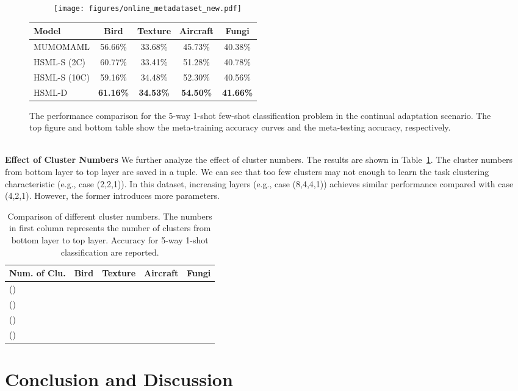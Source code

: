 \documentclass{article}
\begin{document}
\begin{figure}[h]
	\centering
	\begin{subfigure}[b]{0.85\linewidth}
	\centering
		\texttt{[image: figures/online\_metadataset\_new.pdf]}
	\end{subfigure}
	\begin{subtable}{0.95\linewidth}
	\small
        \centering
        \begin{tabular}{l|c|c|c|c}
        \hline
        Model & Bird & Texture & Aircraft & Fungi \\\hline
        MUMOMAML & 56.66\% & 33.68\% & 45.73\% & 40.38\% \\
        HSML-S (2C) & 60.77\% & 33.41\% & 51.28\% & 40.78\%\\
        HSML-S (10C) & 59.16\% & 34.48\% & 52.30\% & 40.56\%\\
        HSML-D & \textbf{61.16\%} & \textbf{34.53\%} & \textbf{54.50\%} & \textbf{41.66\%}\\\hline
        \end{tabular}
    \end{subtable}  
	\caption{The performance comparison for the 5-way 1-shot few-shot classification problem in the continual adaptation scenario. The top figure and bottom table show the meta-training accuracy curves and the meta-testing accuracy, respectively.} 
	\label{fig:metadataset_online}
\end{figure}
\\
\textbf{Effect of Cluster Numbers}
We further analyze the effect of cluster numbers. The results are shown in Table~\ref{tab:cluster_sensitivity}. The cluster numbers from bottom layer to top layer are saved in a tuple. We can see that too few clusters may not enough to learn the task clustering characteristic (e.g., case (2,2,1)). In this dataset, increasing layers (e.g., case (8,4,4,1)) 
achieves similar performance compared with case (4,2,1). However, the former introduces more parameters.
\begin{table}[h]
\caption{Comparison of different cluster numbers. The numbers in first column represents the number of clusters from bottom layer to top layer. Accuracy for 5-way 1-shot classification are reported.} 
\label{tab:cluster_sensitivity}
\footnotesize
\begin{center}
\begin{tabular}{l|c|c|c|c}
\hline
Num. of Clu. & Bird & Texture & Aircraft & Fungi\\\hline
() &  &  &  & \\
() &  &  &  & \\
() &  &  &  & \\
() &  &  &  &  \\\hline
\end{tabular}
\end{center}
\end{table} \section{Conclusion and Discussion}
\end{document}
